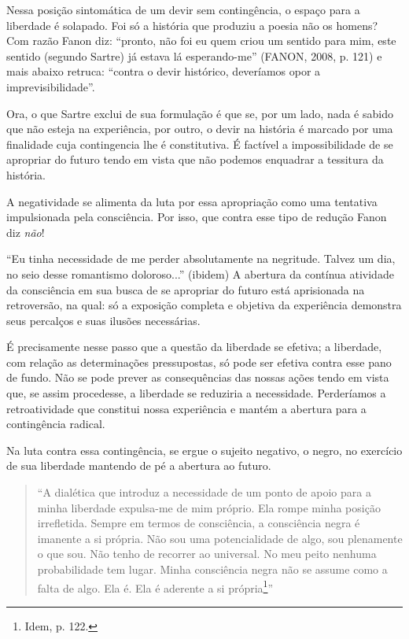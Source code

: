 Nessa posição sintomática de um devir sem contingência, o espaço para a
liberdade é solapado. Foi só a história que produziu a poesia não os
homens? Com razão Fanon diz: ``pronto, não foi eu quem criou um sentido
para mim, este sentido (segundo Sartre) já estava lá esperando-me''
(FANON, 2008, p. 121) e mais abaixo retruca: ``contra o devir histórico,
deveríamos opor a imprevisibilidade''.

Ora, o que Sartre exclui de sua formulação é que se, por um lado, nada é
sabido que não esteja na experiência, por outro, o devir na história é
marcado por uma finalidade cuja contingencia lhe é constitutiva. É
factível a impossibilidade de se apropriar do futuro tendo em vista que
não podemos enquadrar a tessitura da história.

A negatividade se alimenta da luta por essa apropriação como uma
tentativa impulsionada pela consciência. Por isso, que contra esse tipo
de redução Fanon diz \emph{não}!

``Eu tinha necessidade de me perder absolutamente na negritude. Talvez
um dia, no seio desse romantismo doloroso...'' (ibidem) A abertura da
contínua atividade da consciência em sua busca de se apropriar do futuro
está aprisionada na retroversão, na qual: só a exposição completa e
objetiva da experiência demonstra seus percalços e suas ilusões
necessárias.

É precisamente nesse passo que a questão da liberdade se efetiva; a
liberdade, com relação as determinações pressupostas, só pode ser
efetiva contra esse pano de fundo. Não se pode prever as consequências
das nossas ações tendo em vista que, se assim procedesse, a liberdade se
reduziria a necessidade. Perderíamos a retroatividade que constitui
nossa experiência e mantém a abertura para a contingência radical.

Na luta contra essa contingência, se ergue o sujeito negativo, o negro,
no exercício de sua liberdade mantendo de pé a abertura ao futuro.

\begin{quote}
``A dialética que introduz a necessidade de um ponto de apoio para a
minha liberdade expulsa-me de mim próprio. Ela rompe minha posição
irrefletida. Sempre em termos de consciência, a consciência negra é
imanente a si própria. Não sou uma potencialidade de algo, sou
plenamente o que sou. Não tenho de recorrer ao universal. No meu peito
nenhuma probabilidade tem lugar. Minha consciência negra não se assume
como a falta de algo. Ela é. Ela é aderente a si própria\footnote{Idem,
  p. 122.}''
\end{quote}


